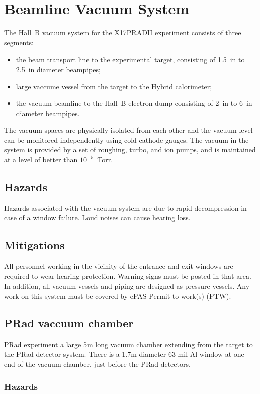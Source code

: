 \section{Beamline Vacuum System}

The Hall~B vacuum system for the X17PRADII experiment consists of three segments: 
\begin{itemize}
\item the beam transport line to the experimental target, consisting of 1.5~in to 2.5~in diameter
beampipes;
\item large vaccume vessel from the target to the Hybrid calorimeter;
\item the vacuum beamline to the Hall~B electron dump consisting of 
2~in to 6~in diameter beampipes. 
\end{itemize}
The vacuum spaces are physically isolated from each
other and the vacuum level can be monitored independently using cold cathode gauges. The
vacuum in the system is provided by a set of roughing, turbo, and ion pumps, and is
maintained at a level of better than $10^{-5}$~Torr. 
\subsection{Hazards} 
Hazards associated with the vacuum system are due to rapid decompression in case of a window 
failure. Loud noises can cause hearing loss. 
\subsection{Mitigations}

All personnel working in the vicinity of the entrance and exit windows are required to wear 
hearing protection. Warning signs must be posted in that area. In addition, all vacuum vessels 
and piping are designed as pressure vessels.  Any work on this system must be covered by ePAS
Permit to work(s) (PTW).

%
\subsection{PRad vaccuum chamber}

PRad experiment a large 5m long vacuum chamber extending from the target to the PRad detector system. 
There is a 1.7m diameter 63 mil Al window at one end of the vacuum chamber, just before the PRad detectors. 

\subsubsection{Hazards}

